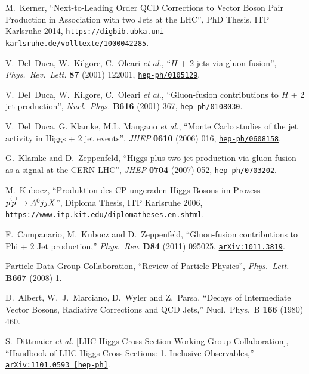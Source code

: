 \documentclass[english,12pt]{article}
\begin{document}
\begin{thebibliography}{10}
  M.~Kerner,
  ``Next-to-Leading Order QCD Corrections to Vector Boson Pair Production in Association with two Jets at the LHC'',
  {PhD Thesis, ITP Karlsruhe 2014}, 
\href{https://digbib.ubka.uni-karlsruhe.de/volltexte/1000042285}{{\tt https://digbib.ubka.uni-karlsruhe.de/volltexte/1000042285}}.

V.~Del~Duca, W.~Kilgore, C.~Oleari {\it et al.}, ``{$H$ + 2
  jets via gluon fusion}'', {\em Phys.\ Rev.\ Lett.} {\bf 87} (2001) 122001,
\href{https://www.arXiv.org/abs/hep-ph/0105129}{{\tt hep-ph/0105129}}.

V.~Del~Duca, W.~Kilgore, C.~Oleari {\it et al.},
  ``{Gluon-fusion contributions to $H$ + 2 jet production}'', {\em Nucl.\ Phys.}
  {\bf B616} (2001) 367,
\href{https://www.arXiv.org/abs/hep-ph/0108030}{{\tt hep-ph/0108030}}.

V.~Del~Duca, G. Klamke, M.L. Mangano {\it et al.}, ``{Monte Carlo studies of the jet activity in Higgs +
  2 jet events}'', {\em JHEP} {\bf 0610} (2006) 016,
\href{https://www.arXiv.org/abs/hep-ph/0608158}{{\tt hep-ph/0608158}}.

G.~Klamke and D.~Zeppenfeld, ``{Higgs plus two jet production via gluon fusion
  as a signal at the CERN LHC}'', {\em JHEP} {\bf 0704} (2007) 052,
\href{https://www.arXiv.org/abs/hep-ph/0703202}{{\tt hep-ph/0703202}}.

M.~Kubocz, ``Produktion des CP-ungeraden Higgs-Bosons im Prozess $p \overset{\mbox{\tiny{(--)}}}{p} \to
  A^{0}jjX$'', {Diploma Thesis, ITP Karlsruhe 2006}, {{\tt https://www.itp.kit.edu/diplomatheses.en.shtml}}.

  F.~Campanario, M.~Kubocz and D.~Zeppenfeld,
  ``Gluon-fusion contributions to Phi + 2 Jet production,''
  {\em Phys.\ Rev.} {\bf D84} (2011) 095025,
  \href{https://www.arXiv.org/abs/1011.3819}{{\tt arXiv:1011.3819}}.

{Particle Data Group} Collaboration, ``{Review of
  Particle Physics}'', {\em Phys.\ Lett.} {\bf B667} (2008) 1.

  D.~Albert, W.~J.~Marciano, D.~Wyler and Z.~Parsa,
  ``Decays of Intermediate Vector Bosons, Radiative Corrections and QCD Jets,''
  Nucl.\ Phys.\ B {\bf 166} (1980) 460.

  S.~Dittmaier {\it et al.} [LHC Higgs Cross Section Working Group Collaboration],
  ``Handbook of LHC Higgs Cross Sections: 1. Inclusive Observables,''
  \href{https://www.arXiv.org/abs/1101.0593}{\tt arXiv:1101.0593 [hep-ph]}.


\end{thebibliography}
\end{document}
